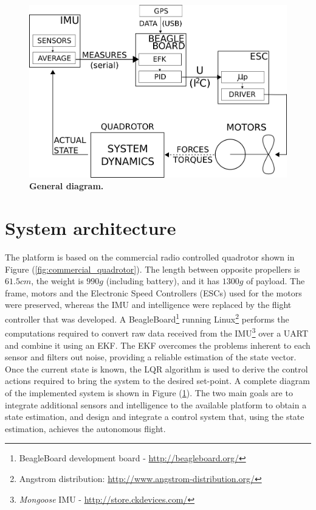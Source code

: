 \documentclass[conference]{IEEEtran}
\newcommand{\refp}[1]{(\ref{#1})}
\begin{document}
\vspace{0.2cm}
\begin{figure}
	\centering
	\includegraphics[width=.8\columnwidth]{./pics_paper/diagrama_general.png}
	\caption{\textbf{General diagram.}}
	\label{fig:diagrama_tio}
	\vspace{-0.5cm}
\end{figure}
\section{System architecture}
The platform is based on the commercial radio controlled quadrotor shown in Figure \refp{fig:commercial_quadrotor}. The length between opposite propellers is $61.5cm$, the weight is $990g$ (including battery), and it has $1300g$ of payload. The frame, motors and the Electronic Speed Controllers (ESCs) used for the motors were preserved, whereas the IMU and intelligence were replaced by the flight controller that was developed. A BeagleBoard\footnote{BeagleBoard development board - \url{http://beagleboard.org/}} running Linux\footnote{Angstrom distribution: \url{http://www.angstrom-distribution.org/}} performs the computations required to convert raw data received from the IMU\footnote{\textit{Mongoose} IMU - \url{http://store.ckdevices.com/}} over a UART and combine it using an EKF. The EKF overcomes the problems inherent to each sensor and filters out noise, providing a reliable estimation of the state vector. Once the current state is known, the LQR algorithm is used to derive the control actions required to bring the system to the desired set-point. A complete diagram of the implemented system is shown in Figure \refp{fig:diagrama_tio}.
The two main goals are to integrate additional sensors and intelligence to the available platform to obtain a state estimation, and design and integrate a control system that, using the state estimation, achieves the autonomous flight.
\end{document}
